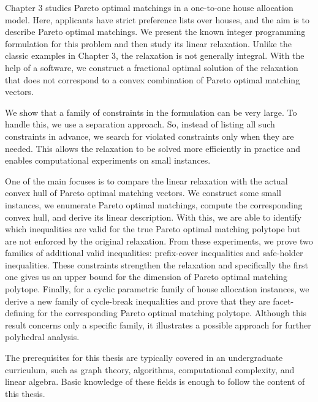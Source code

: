 \documentclass[12pt]{report}
\numberwithin{algorithm}{chapter}
\begin{document}
	Chapter $3$ studies Pareto optimal matchings in a one-to-one house allocation model. Here, applicants have strict preference lists over houses, and the aim is to describe Pareto optimal matchings. We present the known integer programming formulation for this problem and then study its linear relaxation. Unlike the classic examples in Chapter $3$, the relaxation is not generally integral. With the help of a software, we construct a fractional optimal solution of the relaxation that does not correspond to a convex combination of Pareto optimal matching vectors.
	
	We show that a family of constraints in the formulation can be very large. To handle this, we use a separation approach. So, instead of listing all such constraints in advance, we search for violated constraints only when they are needed. This allows the relaxation to be solved more efficiently in practice and enables computational experiments on small instances.
	
	One of the main focuses is to compare the linear relaxation with the actual convex hull of Pareto optimal matching vectors. We construct some small instances, we enumerate Pareto optimal matchings, compute the corresponding convex hull, and derive its linear description. With this, we are able to identify which inequalities are valid for the true Pareto optimal matching polytope but are not enforced by the original relaxation. From these experiments, we prove two families of additional valid inequalities: prefix-cover inequalities and safe-holder inequalities. These constraints strengthen the relaxation and specifically the first one gives us an upper bound for the dimension of Pareto optimal matching polytope. Finally, for a cyclic parametric family of house allocation instances, we derive a new family of cycle-break inequalities and prove that they are facet-defining for the corresponding Pareto optimal matching polytope. Although this result concerns only a specific family, it illustrates a possible approach for further polyhedral analysis.
	
	The prerequisites for this thesis are typically covered in an undergraduate curriculum, such as graph theory, algorithms, computational complexity, and linear algebra. Basic knowledge of these fields is enough to follow the content of this thesis.
	

\clearpage
\tableofcontents

\clearpage
\listoffigures

\end{document}
